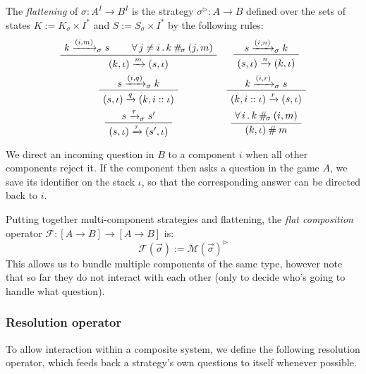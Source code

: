 \begin{definition} %
The \emph{flattening} of $\sigma : A^I \rightarrow B^I$
is the strategy $\sigma^\rhd : A \rightarrow B$
defined over the sets of states
$K := K_\sigma \times I^*$ and
$S := S_\sigma \times I^*$ by the following rules:
\[
  \begin{array}{c@{\quad}c}
    \AxiomC{$k \xrightarrow{(i, m)}_\sigma s$}
    \AxiomC{$\forall \, j \ne i \,.\, k \: \#_{\!\sigma} \: (j, m)$}
    \BinaryInfC{$(k, \iota) \xrightarrow{m} (s, \iota)$}
    \DisplayProof
    &
    \AxiomC{$s \xrightarrow{(i, n)}_\sigma k$}
    \UnaryInfC{$(s, \iota) \xrightarrow{n} (k, \iota)$}
    \DisplayProof
    \\[1.5em]
    \AxiomC{$s \xrightarrow{(i, q)}_\sigma k$}
    \UnaryInfC{$(s, \iota) \xrightarrow{q} (k, i :: \iota)$}
    \DisplayProof
    &
    \AxiomC{$k \xrightarrow{(i, r)}_\sigma s$}
    \UnaryInfC{$(k, i :: \iota) \xrightarrow{r} (s, \iota)$}
    \DisplayProof
    \\[1.5em]
    \AxiomC{$s \xrightarrow{\tau}_\sigma s'$}
    \UnaryInfC{$(s, \iota) \xrightarrow{\tau} (s', \iota)$}
    \DisplayProof
    &
    \AxiomC{$\forall \,i\,.\, k \: \#_{\!\sigma} \: (i, m)$}
    \UnaryInfC{$(k, \iota) \:\#\: m$}
    \DisplayProof
  \end{array}
\]
\end{definition}

We direct an incoming question in $B$
to a component $i$ when all other components reject it.
If the component then asks a question in the game $A$,
we save its identifier on the stack $\iota$,
so that the corresponding answer can be directed back to $i$.

Putting together multi-component strategies and flattening,
the \emph{flat composition} operator
$\mathcal{F} : [A \rightarrow B] \rightarrow [A \rightarrow B]$
is:
\[
    \mathcal{F}(\vec{\sigma}) := \mathcal{M}(\vec{\sigma})^\rhd
\]
This allows us to bundle multiple components of the same type,
however note that so far they do not interact with each other
(only to decide who's going to handle what question).


\subsubsection{Resolution operator} %

To allow interaction within a composite system,
we define the following resolution operator,
which feeds back a strategy's own questions to itself
whenever possible.

